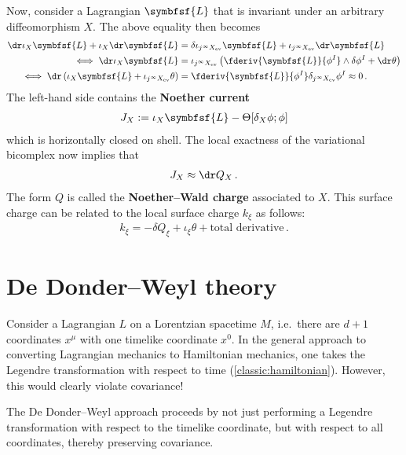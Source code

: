    Now, consider a Lagrangian $\symbfsf{L}$ that is invariant under an arbitrary diffeomorphism $X$. The above equality then becomes
    \begin{align}
        \dr\iota_X\symbfsf{L}+\iota_X\dr\symbfsf{L} &= \delta\iota_{j^\infty X_{\text{ev}}}\symbfsf{L} + \iota_{j^\infty X_{\text{ev}}}\dr\symbfsf{L}\nonumber\\
        \iff\dr\iota_X\symbfsf{L} &= \iota_{j^\infty X_{\text{ev}}}\left(\fderiv{\symbfsf{L}}{\phi^I}\wedge\delta\phi^I + \dr\theta\right)\nonumber\\
        \iff\dr\left(\iota_X\symbfsf{L}+\iota_{j^\infty X_{\text{ev}}}\theta\right) &= \fderiv{\symbfsf{L}}{\phi^I}\delta_{j^\infty X_{\text{ev}}}\phi^I\approx0\,.
    \end{align}
    The left-hand side contains the \textbf{Noether current}
    \begin{gather}
        J_X := \iota_X\symbfsf{L} - \Theta[\delta_X\phi;\phi]
    \end{gather}
    which is horizontally closed on shell. The local exactness of the variational bicomplex now implies that
    \begin{gather}
         J_X \approx \dr Q_X\,.
    \end{gather}
    The form $Q$ is called the \textbf{Noether--Wald charge} associated to $X$. This surface charge can be related to the local surface charge $k_\xi$ as follows:
    \begin{gather}
        k_\xi = -\delta Q_\xi + \iota_\xi\theta + \text{total derivative}\,.
    \end{gather}


\section{De Donder--Weyl theory}

    Consider a Lagrangian $L$ on a Lorentzian spacetime $M$, i.e.~there are $d+1$ coordinates $x^\mu$ with one timelike coordinate $x^0$. In the general approach to converting Lagrangian mechanics to Hamiltonian mechanics, one takes the Legendre transformation with respect to time (\cref{classic:hamiltonian}). However, this would clearly violate covariance!

    The De Donder--Weyl approach proceeds by not just performing a Legendre transformation with respect to the timelike coordinate, but with respect to all coordinates, thereby preserving covariance.

